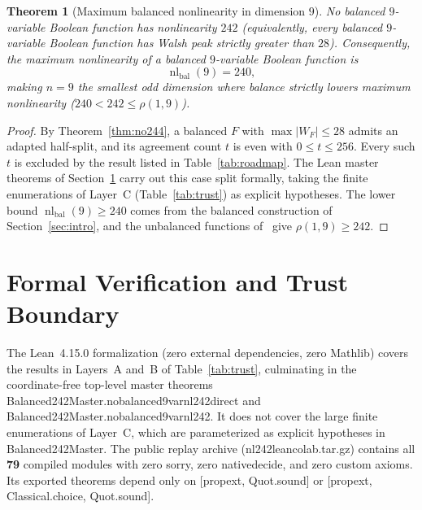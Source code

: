 \documentclass[11pt]{article}
\newtheorem{theorem}{Theorem}[section]
\theoremstyle{definition}
\newcommand{\nl}{\operatorname{nl}}
\newcommand{\code}[1]{{\ttfamily\small\renewcommand{\_}{\textunderscore\allowbreak}#1}}
\begin{document}
\begin{theorem}[Maximum balanced nonlinearity in dimension $9$]
\label{thm:main-nl240}
No balanced $9$-variable Boolean function has nonlinearity $242$ (equivalently, every balanced $9$-variable Boolean function has Walsh peak strictly greater than $28$).
Consequently, the maximum nonlinearity of a balanced $9$-variable Boolean function is
\[
  \nl_{\mathrm{bal}}(9) = 240,
\]
making $n = 9$ the smallest odd dimension where balance strictly lowers maximum nonlinearity ($240 < 242 \le \rho(1,9)$).
\end{theorem}

\begin{proof}
By Theorem~\ref{thm:no244}, a balanced $F$ with $\max|W_F|\le 28$ admits an adapted half-split, and its agreement count $t$ is even with $0\le t\le 256$.
Every such $t$ is excluded by the result listed in Table~\ref{tab:roadmap}.
The Lean master theorems of Section~\ref{sec:verification} carry out this case split formally, taking the finite enumerations of Layer~C (Table~\ref{tab:trust}) as explicit hypotheses.
The lower bound $\nl_{\mathrm{bal}}(9)\ge 240$ comes from the balanced construction of Section~\ref{sec:intro}, and the unbalanced functions of~\cite{KMY2007} give $\rho(1,9)\ge 242$.
\end{proof}

\section{Formal Verification and Trust Boundary}
\label{sec:verification}

The Lean~4.15.0 formalization (zero external dependencies, zero Mathlib) covers the results in Layers~A and~B of Table~\ref{tab:trust}, culminating in the coordinate-free top-level master theorems \code{Balanced242Master.\allowbreak no\_balanced\_9var\_nl242\_direct} and \code{Balanced242Master.\allowbreak no\_balanced\_9var\_nl242}. It does not cover the large finite enumerations of Layer~C, which are parameterized as explicit hypotheses in \code{Balanced242Master}.
The public replay archive (\code{nl242\_lean\_colab.tar.gz}) contains all \textbf{79} compiled modules with zero \code{sorry}, zero \code{native\_decide}, and zero custom axioms. Its exported theorems depend only on \code{[propext, Quot.sound]} or \code{[propext, Classical.choice, Quot.sound]}.
\end{document}
